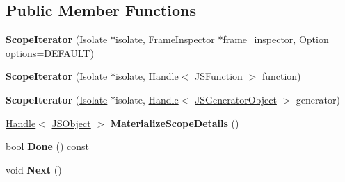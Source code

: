 \subsection*{Public Member Functions}
\begin{DoxyCompactItemize}
\item 
\mbox{\label{classv8_1_1internal_1_1ScopeIterator_aa5ceb578f6dda1f942249eba4365d0b7}} 
{\bfseries Scope\+Iterator} (\mbox{\hyperlink{classv8_1_1internal_1_1Isolate}{Isolate}} $\ast$isolate, \mbox{\hyperlink{classv8_1_1internal_1_1FrameInspector}{Frame\+Inspector}} $\ast$frame\+\_\+inspector, Option options=D\+E\+F\+A\+U\+LT)
\item 
\mbox{\label{classv8_1_1internal_1_1ScopeIterator_ad8c8fb113efb2ce5476078627fea56d3}} 
{\bfseries Scope\+Iterator} (\mbox{\hyperlink{classv8_1_1internal_1_1Isolate}{Isolate}} $\ast$isolate, \mbox{\hyperlink{classv8_1_1internal_1_1Handle}{Handle}}$<$ \mbox{\hyperlink{classv8_1_1internal_1_1JSFunction}{J\+S\+Function}} $>$ function)
\item 
\mbox{\label{classv8_1_1internal_1_1ScopeIterator_aa907674d0b32aa78a7629387d252bd9d}} 
{\bfseries Scope\+Iterator} (\mbox{\hyperlink{classv8_1_1internal_1_1Isolate}{Isolate}} $\ast$isolate, \mbox{\hyperlink{classv8_1_1internal_1_1Handle}{Handle}}$<$ \mbox{\hyperlink{classv8_1_1internal_1_1JSGeneratorObject}{J\+S\+Generator\+Object}} $>$ generator)
\item 
\mbox{\label{classv8_1_1internal_1_1ScopeIterator_a0121c161a7e866f462cc8ca5e14acfdc}} 
\mbox{\hyperlink{classv8_1_1internal_1_1Handle}{Handle}}$<$ \mbox{\hyperlink{classv8_1_1internal_1_1JSObject}{J\+S\+Object}} $>$ {\bfseries Materialize\+Scope\+Details} ()
\item 
\mbox{\label{classv8_1_1internal_1_1ScopeIterator_a400c8837ccd01f4dd552e081e5050be7}} 
\mbox{\hyperlink{classbool}{bool}} {\bfseries Done} () const
\item 
\mbox{\label{classv8_1_1internal_1_1ScopeIterator_a6f0a4ba9b811b41b1ced4133686a89b5}} 
void {\bfseries Next} ()
\item 

\end{DoxyCompactItemize}

